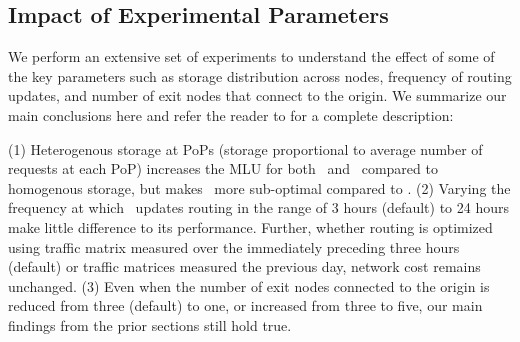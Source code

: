\eat
{

\subsection{Impact of Experimental Parameters}
We perform an extensive set of experiments to understand the effect of some of the key parameters such as storage distribution across nodes, frequency of routing updates, and number of exit nodes that connect to the origin. We summarize our main conclusions here and refer the reader to \cite{techreport} for a complete description:

 (1) Heterogenous storage at PoPs (storage proportional to average number of requests at each PoP) increases the MLU for both \invlru\ and \optrpfuture\ compared to homogenous storage, but makes \invlru\ more sub-optimal compared to \optrpfuture. (2) Varying the frequency at which \optlru\ updates routing in the range of 3 hours (default) to 24 hours make little difference to its performance. Further, whether routing is optimized using traffic matrix measured over the immediately preceding three hours (default) or traffic matrices measured the previous day, network cost remains unchanged. (3) Even when the number of exit nodes connected to the origin is  reduced from three (default) to one, or increased from three to five, our main findings from the prior sections still hold true. 
}


